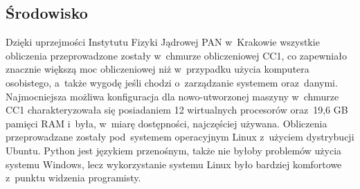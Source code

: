 \subsection{Środowisko}
Dzięki uprzejmości Instytutu Fizyki Jądrowej PAN w~Krakowie wszystkie obliczenia przeprowadzone zostały w~chmurze obliczeniowej CC1\cite{cc1Article}, co zapewniało znacznie większą moc obliczeniowej niż w~przypadku użycia komputera osobistego, a~także wygodę jeśli chodzi o~zarządzanie systemem oraz~danymi. Najmocniejsza możliwa konfiguracja dla nowo-utworzonej maszyny w~chmurze CC1 charakteryzowała się posiadaniem 12 wirtualnych procesorów oraz~19,6 GB pamięci RAM i~była, w~miarę dostępności, najczęściej używana. Obliczenia przeprowadzane zostały pod~systemem operacyjnym Linux z~użyciem dystrybucji Ubuntu. Python jest językiem przenośnym, także nie byłoby problemów użycia systemu Windows, lecz wykorzystanie systemu Linux było bardziej komfortowe z~punktu widzenia programisty.

